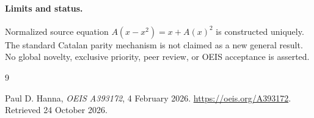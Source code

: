 \documentclass[11pt,a4paper]{article}
\theoremstyle{remark}
\begin{document}
\paragraph{Limits and status.}
Normalized source equation $A(x-x^2)=x+A(x)^2$ is constructed uniquely. The standard Catalan parity mechanism is not claimed as a new general result.
No global novelty, exclusive priority, peer review, or OEIS acceptance is asserted.

\begin{thebibliography}{9}
\raggedright
{}
Paul D. Hanna, \emph{OEIS A393172}, 4 February 2026.
\url{https://oeis.org/A393172}. Retrieved 24 October 2026.
\end{thebibliography}
\end{document}
